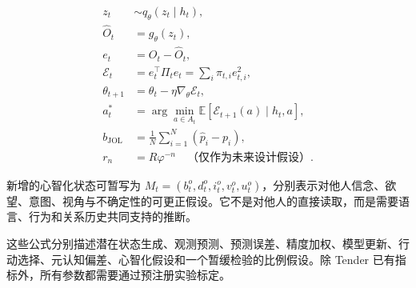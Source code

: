 \documentclass[UTF8,a4paper,11pt]{ctexart}
\begin{document}
\begin{align}
z_t &\sim q_\theta(z_t\mid h_t),\\
\hat O_t &= g_\theta(z_t),\\
e_t &= O_t-\hat O_t,\\
\mathcal E_t &= e_t^{\top}\Pi_t e_t
=\sum_i\pi_{t,i}e_{t,i}^{2},\\
\theta_{t+1} &= \theta_t-\eta\nabla_\theta\mathcal E_t,\\
a_t^\ast &= \arg\min_{a\in A_t}\mathbb E[\mathcal E_{t+1}(a)\mid h_t,a],\\
b_{\mathrm{JOL}} &= \frac{1}{N}\sum_{i=1}^{N}(\hat p_i-p_i),\\
r_n &= R\varphi^{-n}\quad\text{（仅作为未来设计假设）}.
\end{align}

新增的心智化状态可暂写为 $M_t=(b_t^o,d_t^o,i_t^o,v_t^o,u_t^o)$，分别表示对他人信念、欲望、意图、视角与不确定性的可更正假设。它不是对他人的直接读取，而是需要语言、行为和关系历史共同支持的推断。

这些公式分别描述潜在状态生成、观测预测、预测误差、精度加权、模型更新、行动选择、元认知偏差、心智化假设和一个暂缓检验的比例假设。除 Tender 已有指标外，所有参数都需要通过预注册实验标定。
\end{document}
